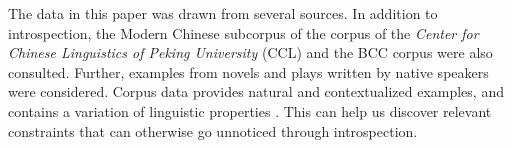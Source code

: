 The data in this paper was drawn from several sources.
In addition to introspection, the Modern Chinese subcorpus of the corpus of the \textit{Center for Chinese Linguistics of Peking University} ({CCL}) \citep{Zhanetal2003, Zhanetal2019} and the BCC corpus \citep{BCC} were also consulted. 
Further, examples from novels and plays written by native speakers were considered.
Corpus data provides natural and contextualized examples, and contains a variation of linguistic properties \citep[921]{MM2009a}.
This can help us discover relevant constraints that can otherwise go unnoticed through introspection.